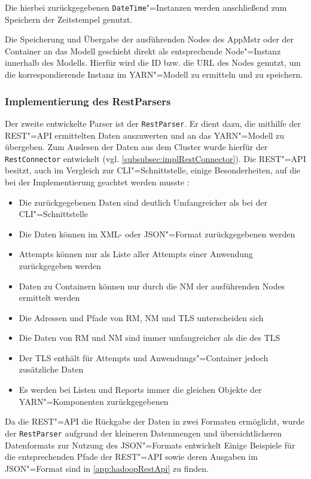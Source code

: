 Die hierbei zurückgegebenen \texttt{DateTime}"=Instanzen werden anschließend zum Speichern der Zeitstempel genutzt.

Die Speicherung und Übergabe der ausführenden Nodes des \ac{AppMstr} oder der Container an das Modell geschieht direkt als entsprechende Node"=Instanz innerhalb des Modells.
Hierfür wird die ID bzw. die URL des Nodes genutzt, um die korrespondierende Instanz im \ac{YARN}"=Modell zu ermitteln und zu speichern.

\subsubsection{Implementierung des RestParsers}
\label{subsubsec:implRestParser}

Der zweite entwickelte Parser ist der \texttt{RestParser}.
Er dient dazu, die mithilfe der REST"=API ermittelten Daten auszuwerten und an das \ac{YARN}"=Modell zu übergeben.
Zum Auslesen der Daten aus dem Cluster wurde hierfür der \texttt{RestConnector} entwickelt (vgl. \cref{subsubsec:implRestConnector}).
Die REST"=API besitzt, auch im Vergleich zur \ac{CLI}"=Schnittstelle, einige Besonderheiten, auf die bei der Implementierung geachtet werden musste \cite{HadoopYarnCmds271,HadoopRmApi271,HadoopNmApi271,HadoopYarnTlServer271}:

\begin{itemize}
    \item Die zurückgegebenen Daten sind deutlich Umfangreicher als bei der \ac{CLI}"=Schnittstelle
    \item Die Daten können im XML- oder JSON"=Format zurückgegebenen werden
    \item Attempts können nur als Liste aller Attempts einer Anwendung zurückgegeben werden
    \item Daten zu Containern können nur durch die \ac{NM} der ausführenden Nodes ermittelt werden
    \item Die Adressen und Pfade von \ac{RM}, \ac{NM} und \ac{TLS} unterscheiden sich
    \item Die Daten von \ac{RM} und \ac{NM} sind immer umfangreicher als die des \ac{TLS}
    \item Der \ac{TLS} enthält für Attempts und Anwendungs"=Container jedoch zusätzliche Daten
    \item Es werden bei Listen und Reports immer die gleichen Objekte der \ac{YARN}"=Komponenten zurückgegebenen
\end{itemize}

Da die REST"=API die Rückgabe der Daten in zwei Formaten ermöglicht, wurde der \texttt{RestParser} aufgrund der kleineren Datenmengen und übersichtlicheren Datenformats zur Nutzung des JSON"=Formats entwickelt
Einige Beispiele für die entsprechenden Pfade der REST"=API sowie deren Ausgaben im JSON"=Format sind in \cref{app:hadoopRestApi} zu finden.

